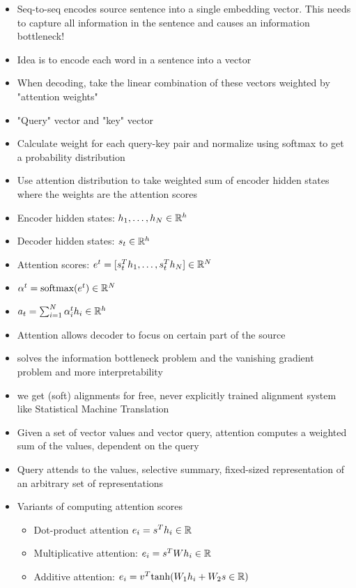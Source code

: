 \documentclass[../main.tex]{subfiles}
\begin{document}
\begin{itemize}
  \item Seq-to-seq encodes source sentence into a single embedding vector. This needs to capture all information in the sentence and causes an information bottleneck!
  \item Idea is to encode each word in a sentence into a vector
  \item When decoding, take the linear combination of these vectors weighted by "attention weights"
  \item "Query" vector and "key" vector
  \item Calculate weight for each query-key pair and normalize using softmax to get a probability distribution
  \item Use attention distribution to take weighted sum of encoder hidden states where the weights are the attention scores
  \item Encoder hidden states: $h_{1}, \dotsc, h_{N} \in \mathbb{R}^{h}$
  \item Decoder hidden states: $s_{t} \in \mathbb{R}^{h}$
  \item Attention scores: $e^{t} = [s_{t}^{T}h_{1}, \dotsc, s_{t}^{T}h_{N}] \in \mathbb{R}^{N}$
  \item $\alpha^{t} = \text{softmax}(e^{t}) \in \mathbb{R}^{N}$
  \item $a_{t} = \sum_{i=1}^{N} \alpha_{i}^{t}h_{i} \in \mathbb{R}^{h}$
  \item Attention allows decoder to focus on certain part of the source
  \item solves the information bottleneck problem and the vanishing gradient problem and more interpretability
  \item we get (soft) alignments for free, never explicitly trained alignment system like Statistical Machine Translation
  \item Given a set of vector values and vector query, attention computes a weighted sum of the values, dependent on the query
  \item Query attends to the values, selective summary, fixed-sized representation of an arbitrary set of representations
  \item Variants of computing attention scores
  \begin{itemize}
    \item Dot-product attention $e_{i} = s^{T}h_{i} \in \mathbb{R}$
    \item Multiplicative attention: $e_{i} = s^{T}Wh_{i} \in \mathbb{R}$
    \item Additive attention: $e_{i} = v^{T}\text{tanh}(W_{1}h_{i} + W_{2}s \in \mathbb{R})$
  \end{itemize}

\end{itemize}
\end{document}
